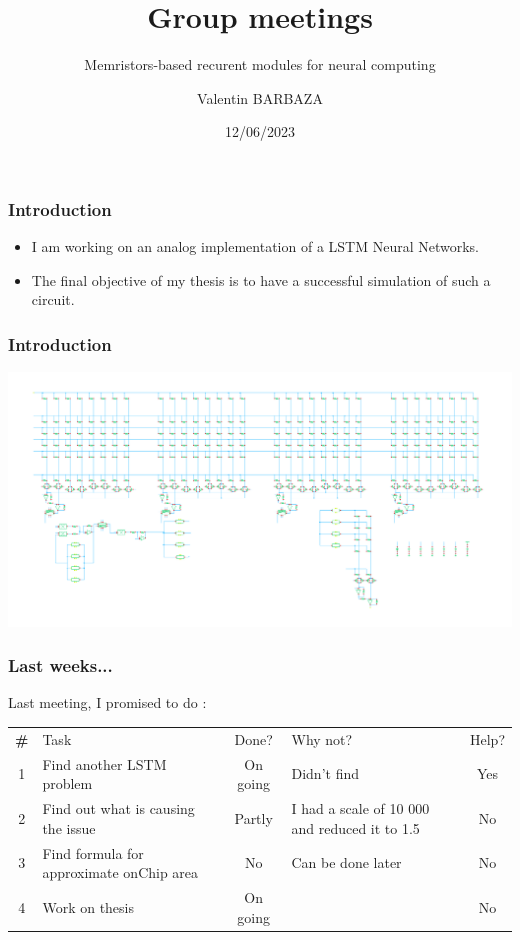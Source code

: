 \documentclass[table]{beamer}
\title{Group meetings}
\subtitle{Memristors-based recurent modules for neural computing}
\author[V. BARBAZA]{Valentin BARBAZA}
\date{12/06/2023}
\begin{document}
  \frame{\titlepage}


  \begin{frame}
    \frametitle{Introduction}

    \begin{itemize}
        \color{text}
      \item I am working on an analog implementation of a LSTM Neural Networks.
      \item The final objective of my thesis is to have a successful simulation of such a circuit.
    \end{itemize}

  \end{frame}


  \begin{frame}
    \frametitle{Introduction}
    \centering\includegraphics[width=\textwidth]{lstm/lstm-np}
  \end{frame}

  \begin{frame}
    \frametitle{Last weeks...}

    Last meeting, I promised to do :

    \centering
    \begin{tabular}{ c m{4cm} c m{2cm} c }
      \rowcolor{firstRow}
      \color{white}\textbf{\#} & \centering\color{white}Task & \color{white}Done? & \color{white}Why not? & \color{white}Help? \\
      1 & Find another LSTM problem & On going & Didn't find & Yes\\
      2 & Find out what is causing the issue & Partly & I had a scale of 10 000 and reduced it to 1.5 & No\\
      3 & Find formula for approximate onChip area & No & Can be done later & No\\
      4 & Work on thesis & On going & & No\\
    \end{tabular}

  \end{frame}
\end{document}

